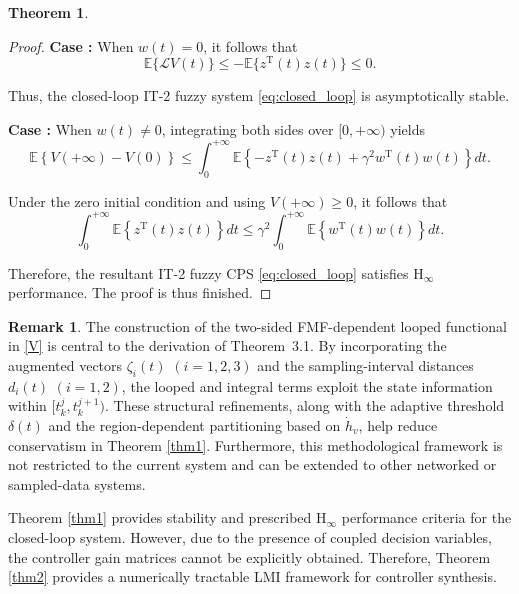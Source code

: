 \documentclass[preprint,review,fleqn,sort&compress,3p]{elsarticle}
\theoremstyle{definition} %
\theoremstyle{definition}%
\newtheorem{thm}{Theorem}[section]
\newtheorem{rem}{Remark}[section]
\begin{document}
\begin{thm}
\begin{proof}
\textbf{Case \uppercase\expandafter{}:} When $w(t)=0$, it follows that
\begin{equation}
	\mathbb{E}\{\mathcal{L}V(t)\}
	\leq
	-\mathbb{E}\{z^{\mathrm{T}}(t)z(t)\}
	\leq 0.
\end{equation}

Thus, the closed-loop IT-2 fuzzy system \eqref{eq:closed_loop} is asymptotically stable.

\textbf{Case \uppercase\expandafter{}:} When $w(t)\neq0$, integrating both sides over $[0,+\infty)$ yields
\begin{equation}
	\mathbb{E}\left\{V(+\infty)-V(0)\right\}
	\leq
	\int_{0}^{+\infty}
	\mathbb{E}\left\{
	-z^{\mathrm{T}}(t)z(t)
	+\gamma^2 w^{\mathrm{T}}(t)w(t)
	\right\}dt.
\end{equation}

Under the zero initial condition and using $V(+\infty)\ge0$, it follows that
\begin{equation}
	\int_{0}^{+\infty}
	\mathbb{E}\left\{
	z^{\mathrm{T}}(t)z(t)
	\right\}dt
	\leq
	\gamma^2
	\int_{0}^{+\infty}
	\mathbb{E}\left\{
	w^{\mathrm{T}}(t)w(t)
	\right\}dt.
\end{equation}

Therefore, the resultant IT-2 fuzzy CPS \eqref{eq:closed_loop} satisfies $\mathrm{H}_\infty$ performance. The proof is thus finished.
\end{proof}
\end{thm}
\begin{rem}
The construction of the two-sided FMF-dependent looped functional in \eqref{V} is central to the derivation of Theorem~3.1.
By incorporating the augmented vectors $\zeta_i(t)$ $(i=1,2,3)$ and the sampling-interval distances $d_i(t)$ $(i=1,2)$, the looped and integral terms exploit the state information within $[t_k^j,t_k^{j+1})$.
These structural refinements, along with the adaptive threshold $\delta(t)$ and the region-dependent partitioning based on $\dot{h}_v$, help reduce conservatism in Theorem \ref{thm1}.
Furthermore, this methodological framework is not restricted to the current system and can be extended to other networked or sampled-data systems.
\end{rem}
Theorem \ref{thm1} provides stability and prescribed $\mathrm{H}_{\infty}$ performance criteria for the closed-loop system.
However, due to the presence of coupled decision variables, the controller gain matrices cannot be explicitly obtained. Therefore, Theorem \ref{thm2} provides a numerically tractable LMI framework for controller synthesis.
\end{document}
